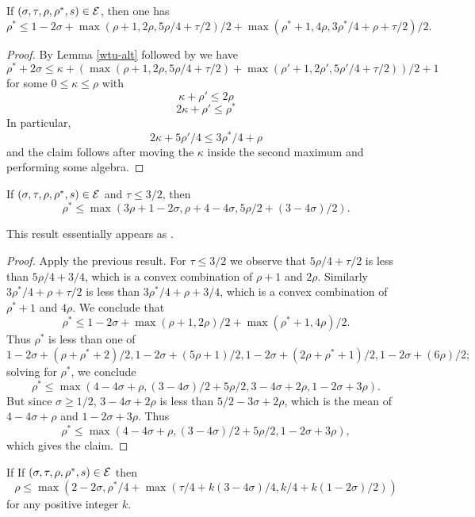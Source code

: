 \begin{theorem}\label{hbt}\cite[(33)]{heathbrown_zero_1979} If $(\sigma,\tau,\rho,\rho^*,s) \in \mathcal{E}$, then one has
$$ \rho^* \leq 1-2\sigma + \max(\rho+1, 2\rho, 5\rho/4+\tau/2)/2 + \max(\rho^*+1, 4\rho, 3\rho^*/4+\rho+\tau/2)/2.$$
\end{theorem}

\begin{proof} By Lemma \ref{wtu-alt} followed by  we have
$$ \rho^* + 2\sigma \leq \kappa + ( \max( \rho+1, 2\rho, 5\rho/4+\tau/2)+ \max( \rho'+1, 2\rho', 5\rho'/4+\tau/2) )/2 + 1$$
for some $0 \leq \kappa \leq \rho$ with
$$ \kappa + \rho' \leq 2\rho$$
$$ 2\kappa + \rho' \leq \rho^*$$
In particular,
$$ 2\kappa + 5\rho'/4 \leq 3\rho^*/4 + \rho$$
and the claim follows after moving the $\kappa$ inside the second maximum and performing some algebra.
\end{proof}

\begin{corollary}\label{hb-energy-simp}  If $(\sigma,\tau,\rho,\rho^*,s) \in \mathcal{E}$ and $\tau \leq 3/2$, then
$$ \rho^* \leq \max(3 \rho + 1-2\sigma, \rho +4-4\sigma, 5\rho/2 + (3-4\sigma)/2).$$
\end{corollary}

This result essentially appears as \cite[Lemma 3]{heathbrown_zero_1979}.

\begin{proof} Apply the previous result.  For $\tau \leq 3/2$ we observe that $5\rho/4+\tau/2$ is less than $5\rho/4 + 3/4$, which is a convex combination of $\rho+1$ and $2\rho$.  Similarly $3\rho^*/4+\rho+\tau/2$ is less than $3\rho^*/4+\rho+3/4$, which is a convex combination of $\rho^*+1$ and $4\rho$. We conclude that
$$ \rho^* \leq  1-2\sigma + \max(\rho+1, 2\rho)/2 + \max(\rho^*+1, 4\rho)/2.$$
Thus $\rho^*$ is less than one of
$$ 1-2\sigma + (\rho+\rho^*+2)/2, 1-2\sigma + (5\rho+1)/2, 1-2\sigma + (2\rho+\rho^*+1)/2, 1-2\sigma + (6\rho)/2;$$
solving for $\rho^*$, we conclude
$$ \rho^* \leq \max( 4-4\sigma + \rho, (3-4\sigma)/2 + 5\rho/2, 3-4\sigma + 2\rho, 1-2\sigma + 3\rho).$$
But since $\sigma \geq 1/2$, $3-4\sigma + 2\rho$ is less than $5/2-3\sigma + 2\rho$, which is the mean of $4-4\sigma+\rho$ and $1-2\sigma+3\rho$. Thus
$$ \rho^* \leq \max( 4-4\sigma + \rho, (3-4\sigma)/2 + 5\rho/2, 1-2\sigma + 3\rho),$$
which gives the claim.
\end{proof}


\begin{lemma} If If $(\sigma,\tau,\rho,\rho^*,s) \in \mathcal{E}$ then
$$ \rho \leq \max( 2-2\sigma, \rho^*/4 + \max(\tau/4 + k(3-4\sigma)/4, k/4 + k(1-2\sigma)/2))$$
for any positive integer $k$.
\end{lemma}

